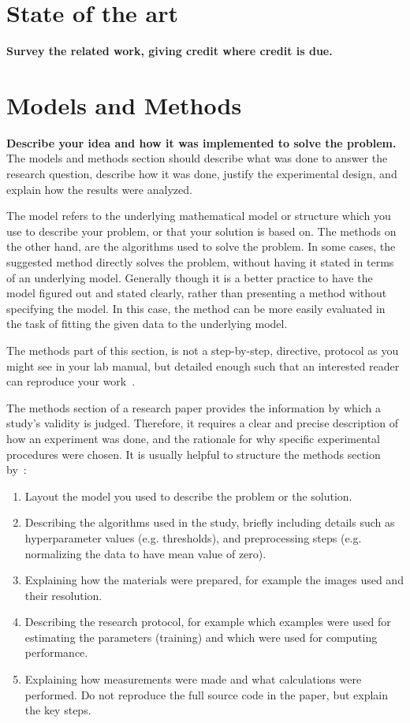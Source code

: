 \documentclass[10pt,conference,compsocconf]{IEEEtran}
\begin{document}
\section{State of the art}\label{sec:state-of-art}
\textbf{Survey the related work, giving credit where credit is
  due.}

\section{Models and Methods}\label{sec:models-methods}
\textbf{ Describe your idea and how it was implemented to solve
  the problem.}
The models and methods
section should describe what was
done to answer the research question, describe how it was done,
justify the experimental design, and
explain how the results were analyzed.

The model refers to the underlying mathematical model or structure which 
you use to describe your problem, or that your solution is based on. 
The methods on the other hand, are the algorithms used to solve the problem. 
In some cases, the suggested method directly solves the problem, without having it 
stated in terms of an underlying model. Generally though it is a better practice to have 
the model figured out and stated clearly, rather than presenting a method without specifying 
the model. In this case, the method can be more easily evaluated in the task of fitting 
the given data to the underlying model.

The methods part of this section, is not a step-by-step, directive,
protocol as you might see in your lab manual, but detailed enough such
that an interested reader can reproduce your
work~\cite{anderson04,wavelab}.

The methods section of a research paper provides the information by
which a study's validity is judged.
Therefore, it requires a clear and precise description of how an
experiment was done, and the rationale
for why specific experimental procedures were chosen.
It is usually helpful to
structure the methods section by~\cite{kallet04methods}:
\begin{enumerate}
\item Layout the model you used to describe the problem or the solution.
\item Describing the algorithms used in the study, briefly including
  details such as hyperparameter values (e.g. thresholds), and
  preprocessing steps (e.g. normalizing the data to have mean value of
  zero).
\item Explaining how the materials were prepared, for example the
  images used and their resolution.
\item Describing the research protocol, for example which examples
  were used for estimating the parameters (training) and which were
  used for computing performance.
\item Explaining how measurements were made and what
  calculations were performed. Do not reproduce the full source code in
  the paper, but explain the key steps.
\end{enumerate}
 
\end{document}
